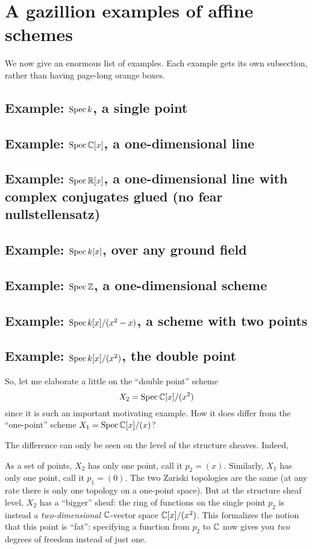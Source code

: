 \section{A gazillion examples of affine schemes}
We now give an enormous list of examples.
Each example gets its own subsection,
rather than having page-long orange boxes.


\subsection{Example: $\operatorname{Spec} k$, a single point}

\subsection{Example: $\operatorname{Spec} \mathbb C[x]$, a one-dimensional line}
\subsection{Example: $\operatorname{Spec} \mathbb R[x]$, a one-dimensional line with complex conjugates glued (no fear nullstellensatz)}
\subsection{Example: $\operatorname{Spec} k[x]$, over any ground field}
\subsection{Example: $\operatorname{Spec} \mathbb Z$, a one-dimensional scheme}

\subsection{Example: $\operatorname{Spec} k[x] / (x^2-x)$, a scheme with two points}
\subsection{Example: $\operatorname{Spec} k[x]/(x^2)$, the double point}
So, let me elaborate a little on the ``double point'' scheme
\[ X_2 = \operatorname{Spec} \mathbb C[x] / (x^2) \]
since it is such an important motivating example.
How it does differ from the ``one-point'' scheme $X_1 = \operatorname{Spec} \mathbb C[x] / (x)$?

The difference can only be seen on the level of the structure sheaves.
Indeed,
\begin{itemize}
	\ii As a set of points, $X_2$ has only one point, call it $p_2 = (x)$.
	Similarly, $X_1$ has only one point, call it $p_1 = (0)$.
	\ii The two Zariski topologies are the same
	(at any rate there is only one topology on a one-point space).
	\ii But at the structure sheaf level, $X_2$ has a ``bigger'' sheaf:
	the ring of functions on the single point $p_2$ is instead
	a \emph{two-dimensional} $\mathbb C$-vector space $\mathbb C[x]/(x^2)$.
	This formalizes the notion that this point is ``fat'':
	specifying a function from $p_2$ to $\mathbb C$ now gives you
	\emph{two} degrees of freedom instead of just one.
\end{itemize}

